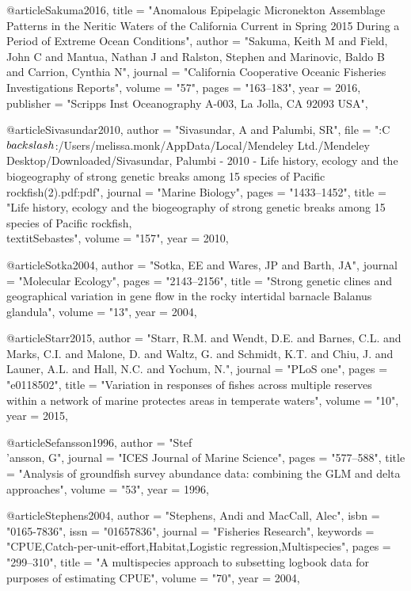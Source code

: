 @article{Sakuma2016,
    title = "{Anomalous Epipelagic Micronekton Assemblage Patterns in the Neritic Waters of the California Current in Spring 2015 During a Period of Extreme Ocean Conditions}",
    author = "{Sakuma, Keith M and Field, John C and Mantua, Nathan J and Ralston, Stephen and Marinovic, Baldo B and Carrion, Cynthia N}",
    journal = "{California Cooperative Oceanic Fisheries Investigations Reports}",
    volume = "{57}",
    pages = "{163--183}",
    year = 2016,
    publisher = "{Scripps Inst Oceanography A-003, La Jolla, CA 92093 USA}",
}

@article{Sivasundar2010,
    author = "{Sivasundar, A and Palumbi, SR}",
    file = "{:C$\\backslash$:/Users/melissa.monk/AppData/Local/Mendeley Ltd./Mendeley Desktop/Downloaded/Sivasundar, Palumbi - 2010 - Life history, ecology and the biogeography of strong genetic breaks among 15 species of Pacific rockfish(2).pdf:pdf}",
    journal = "{Marine Biology}",
    pages = "{1433--1452}",
    title = "{{Life history, ecology and the biogeography of strong genetic breaks among 15 species of Pacific rockfish, \\textit{{Sebastes}}}}",
    volume = "{157}",
    year = 2010,
}

@article{Sotka2004,
    author = "{Sotka, EE and Wares, JP and Barth, JA}",
    journal = "{Molecular Ecology}",
    pages = "{2143--2156}",
    title = "{{Strong genetic clines and geographical variation in gene flow in the rocky intertidal barnacle Balanus glandula}}",
    volume = "{13}",
    year = 2004,
}

@article{Starr2015,
    author = "{Starr, R.M. and Wendt, D.E. and Barnes, C.L. and Marks, C.I. and Malone, D. and Waltz, G. and Schmidt, K.T. and Chiu, J. and Launer, A.L. and Hall, N.C. and Yochum, N.}",
    journal = "{PLoS one}",
    pages = "{e0118502}",
    title = "{{Variation in responses of fishes across multiple reserves within a network of marine protectes areas in temperate waters}}",
    volume = "{10}",
    year = 2015,
}

@article{Sefansson1996,
    author = "{Stef\\'{a}nsson, G}",
    journal = "{ICES Journal of Marine Science}",
    pages = "{577--588}",
    title = "{{Analysis of groundfish survey abundance data: combining the GLM and delta approaches}}",
    volume = "{53}",
    year = 1996,
}

@article{Stephens2004,
    author = "{Stephens, Andi and MacCall, Alec}",
    isbn = "{0165-7836}",
    issn = "{01657836}",
    journal = "{Fisheries Research}",
    keywords = "{CPUE,Catch-per-unit-effort,Habitat,Logistic regression,Multispecies}",
    pages = "{299--310}",
    title = "{{A multispecies approach to subsetting logbook data for purposes of estimating CPUE}}",
    volume = "{70}",
    year = 2004,
}

